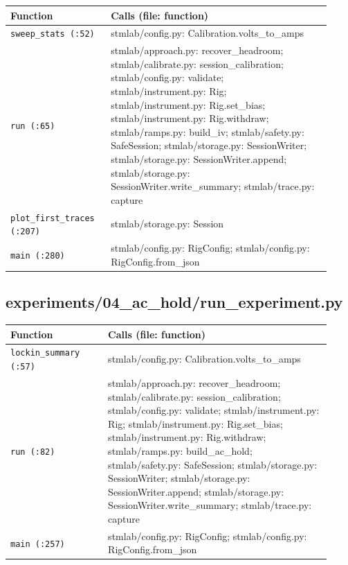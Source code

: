 \small\setlength{\LTleft}{0pt}\setlength{\LTright}{\fill}
\begin{longtable}{@{}>{\raggedright\arraybackslash}p{0.280\linewidth}>{\raggedright\arraybackslash}p{0.640\linewidth}@{}}
\toprule
\textbf{Function} & \textbf{Calls (file: function)} \\
\midrule\endhead
\texttt{sweep\_\discretionary{}{}{}stats (:52)} & stmlab/config.py: Calibration.volts\_to\_amps \\
\texttt{run (:65)} & stmlab/approach.py: recover\_headroom; stmlab/calibrate.py: session\_calibration; stmlab/config.py: validate; stmlab/instrument.py: Rig; stmlab/instrument.py: Rig.set\_bias; stmlab/instrument.py: Rig.withdraw; stmlab/ramps.py: build\_iv; stmlab/safety.py: SafeSession; stmlab/storage.py: SessionWriter; stmlab/storage.py: SessionWriter.append; stmlab/storage.py: SessionWriter.write\_summary; stmlab/trace.py: capture \\
\texttt{plot\_\discretionary{}{}{}first\_\discretionary{}{}{}traces (:207)} & stmlab/storage.py: Session \\
\texttt{main (:280)} & stmlab/config.py: RigConfig; stmlab/config.py: RigConfig.from\_json \\
\bottomrule
\end{longtable}
\normalsize

\subsection{experiments/04\_ac\_hold/run\_experiment.py}

\small\setlength{\LTleft}{0pt}\setlength{\LTright}{\fill}
\begin{longtable}{@{}>{\raggedright\arraybackslash}p{0.280\linewidth}>{\raggedright\arraybackslash}p{0.640\linewidth}@{}}
\toprule
\textbf{Function} & \textbf{Calls (file: function)} \\
\midrule\endhead
\texttt{lockin\_\discretionary{}{}{}summary (:57)} & stmlab/config.py: Calibration.volts\_to\_amps \\
\texttt{run (:82)} & stmlab/approach.py: recover\_headroom; stmlab/calibrate.py: session\_calibration; stmlab/config.py: validate; stmlab/instrument.py: Rig; stmlab/instrument.py: Rig.set\_bias; stmlab/instrument.py: Rig.withdraw; stmlab/ramps.py: build\_ac\_hold; stmlab/safety.py: SafeSession; stmlab/storage.py: SessionWriter; stmlab/storage.py: SessionWriter.append; stmlab/storage.py: SessionWriter.write\_summary; stmlab/trace.py: capture \\
\texttt{main (:257)} & stmlab/config.py: RigConfig; stmlab/config.py: RigConfig.from\_json \\
\bottomrule
\end{longtable}
\normalsize

